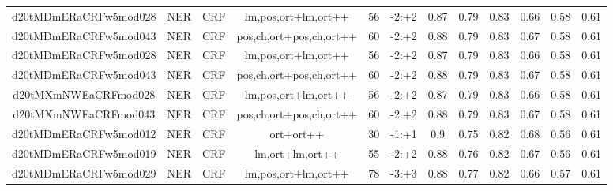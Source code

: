 \documentclass[a4paper]{article}
\begin{document}
\begin{landscape}
\begin{center}
\begin{tabular}{ |c|c|c|c|c|c|c|c|c|c|c|c|}
 	
 
 	
 		
 		\small{ d20tMDmERaCRFw5mod028 } & NER & CRF & lm,pos,ort+lm,ort++  &  56 &  -2:+2  &  0.87 & 0.79 & 0.83  &  0.66 & 0.58 & 0.61 \\
 		

 	
 
 	
 		
 		\small{ d20tMDmERaCRFw5mod043 } & NER & CRF & pos,ch,ort+pos,ch,ort++  &  60 &  -2:+2  &  0.88 & 0.79 & 0.83  &  0.67 & 0.58 & 0.61 \\
 		

 	
 
 	
 		
 		\small{ d20tMDmERaCRFw5mod028 } & NER & CRF & lm,pos,ort+lm,ort++  &  56 &  -2:+2  &  0.87 & 0.79 & 0.83  &  0.66 & 0.58 & 0.61 \\
 		

 	
 
 	
 		
 		\small{ d20tMDmERaCRFw5mod043 } & NER & CRF & pos,ch,ort+pos,ch,ort++  &  60 &  -2:+2  &  0.88 & 0.79 & 0.83  &  0.67 & 0.58 & 0.61 \\
 		

 	
 
 	
 		
 		\small{ d20tMXmNWEaCRFmod028 } & NER & CRF & lm,pos,ort+lm,ort++  &  56 &  -2:+2  &  0.87 & 0.79 & 0.83  &  0.66 & 0.58 & 0.61 \\
 		

 	
 
 	
 		
 		\small{ d20tMXmNWEaCRFmod043 } & NER & CRF & pos,ch,ort+pos,ch,ort++  &  60 &  -2:+2  &  0.88 & 0.79 & 0.83  &  0.67 & 0.58 & 0.61 \\
 		

 	
 
 	
 		
 		\small{ d20tMDmERaCRFw5mod012 } & NER & CRF & ort+ort++  &  30 &  -1:+1  &  0.9 & 0.75 & 0.82  &  0.68 & 0.56 & 0.61 \\
 		

 	
 
 	
 		
 		\small{ d20tMDmERaCRFw5mod019 } & NER & CRF & lm,ort+lm,ort++  &  55 &  -2:+2  &  0.88 & 0.76 & 0.82  &  0.67 & 0.56 & 0.61 \\
 		

 	
 
 	
 		
 		\small{ d20tMDmERaCRFw5mod029 } & NER & CRF & lm,pos,ort+lm,ort++  &  78 &  -3:+3  &  0.88 & 0.77 & 0.82  &  0.66 & 0.57 & 0.61 \\
 		

\end{tabular}
\end{center}
\end{landscape}
\end{document}
